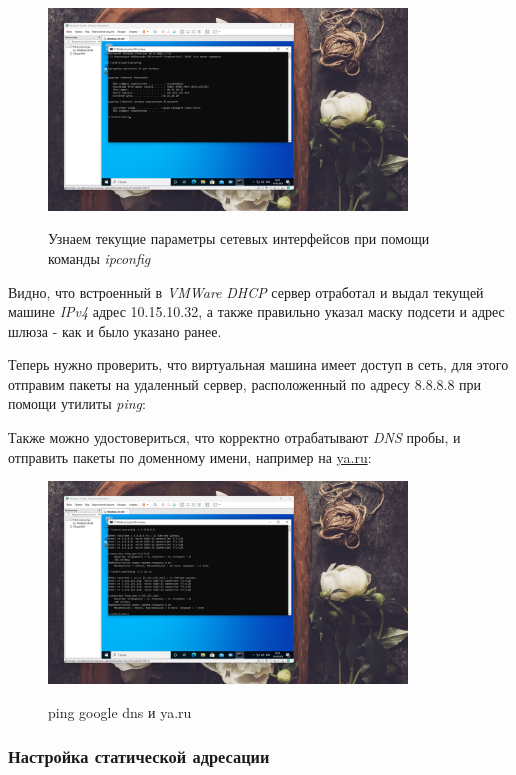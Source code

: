 \documentclass[a4paper]{article}
\begin{document}
  \begin{figure}[H]
    \centering
    \includegraphics[width=0.85\textwidth]{06_00 (15)}
    \label{img:15}
    \caption{Узнаем текущие параметры сетевых интерфейсов при помощи команды \textit{ipconfig}}
  \end{figure}
  
  Видно, что встроенный в \textit{VMWare} \textit{DHCP} сервер отработал и выдал 
  текущей машине \textit{IPv4} адрес 10.15.10.32, а также правильно указал маску подсети
  и адрес шлюза - как и было указано ранее.

  Теперь нужно проверить, что виртуальная машина имеет доступ в сеть, для этого отправим
  пакеты на удаленный сервер, расположенный по адресу 8.8.8.8 при помощи утилиты \textit{ping}:
  
  Также можно удостовериться, что корректно отрабатывают \textit{DNS} пробы, и отправить
  пакеты по доменному имени, например на \href{ya.ru}{ya.ru}:

  \begin{figure}[H]
    \centering
    \includegraphics[width=0.85\textwidth]{06_00 (16)}
    \label{img:16}
    \caption{ping google dns и ya.ru}
  \end{figure}
  
  \subsubsection{Настройка статической адресации}
  
\end{document}
